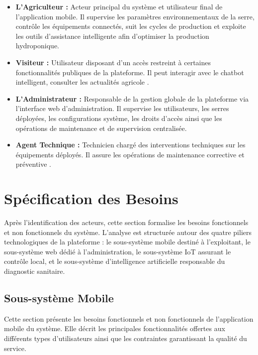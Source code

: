 \begin{itemize}
	\item \textbf{L'Agriculteur :} Acteur principal du système et utilisateur final de l’application mobile. Il supervise les paramètres environnementaux de la serre, contrôle les équipements connectés, suit les cycles de production et exploite les outils d’assistance intelligente afin d’optimiser la production hydroponique.
	
	\item \textbf{Visiteur :} Utilisateur disposant d’un accès restreint à certaines fonctionnalités publiques de la plateforme. Il peut interagir avec le chatbot intelligent, consulter les actualités agricole .
	
	\item \textbf{L'Administrateur :} Responsable de la gestion globale de la plateforme via l’interface web d’administration. Il supervise les utilisateurs, les serres déployées, les configurations système, les droits d’accès ainsi que les opérations de maintenance et de supervision centralisée.
	
	\item \textbf{Agent Technique :} Technicien chargé des interventions techniques sur les équipements déployés. Il assure les opérations de maintenance corrective et préventive .
\end{itemize}
\section{Spécification des Besoins}

Après l’identification des acteurs, cette section formalise les besoins fonctionnels et non fonctionnels du système. L’analyse est structurée autour des quatre piliers technologiques de la plateforme : le sous-système mobile destiné à l’exploitant, le sous-système web dédié à l’administration, le sous-système IoT assurant le contrôle local, et le sous-système d’intelligence artificielle responsable du diagnostic sanitaire.

\subsection{Sous-système Mobile}
Cette section présente les besoins fonctionnels et non fonctionnels de l’application mobile du système.
Elle décrit les principales fonctionnalités offertes aux différents types d’utilisateurs ainsi que les contraintes garantissant la qualité du service.
